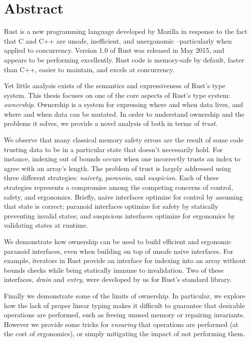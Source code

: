 {}
\begingroup
\let\clearpage\relax
\let\cleardoublepage\relax
\let\cleardoublepage\relax

\chapter*{Abstract}
Rust is a new programming language developed by Mozilla in response to the fact
that C and C++ are unsafe, inefficient, and unergonomic --particularly when
applied to concurrency. Version 1.0 of Rust was released in May 2015, and appears
to be performing excellently. Rust code is memory-safe
by default, faster than C++, easier to maintain, and excels at concurrency.

Yet little analysis exists of the semantics and expressiveness of Rust's type
system. This thesis focuses on one of the core aspects of Rust's type system:
\emph{ownership}. Ownership is a system for expressing where and when data lives, and
where and when data can be mutated. In order to understand ownership and the
problems it solves, we provide a novel analysis of both in terms of \emph{trust}.

We observe that many classical memory safety errors are the result of some
code trusting data to be in a particular state that doesn't necessarily hold.
For instance, indexing out of bounds occurs when one incorrectly trusts an
index to agree with an array's length. The problem of trust is largely addressed using three
different strategies: \emph{naivety}, \emph{paranoia}, and \emph{suspicion}. Each
of these strategies represents a compromise among the competing concerns of control, safety, and
ergonomics. Briefly, naive interfaces optimize for control by assuming that
state is correct; paranoid interfaces optimize for safety by statically preventing
invalid states; and suspicious interfaces optimize for ergonomics by validating
states at runtime.

We demonstrate how ownership can be used to build efficient and ergonomic
paranoid interfaces, even when building on top of unsafe naive interfaces. For example,
iterators in Rust provide an interface for indexing into an array
without bounds checks while being statically immune to invalidation.
Two of these interfaces, \emph{drain} and \emph{entry}, were developed by us for Rust's
standard library.

Finally we demonstrate some of the limits of ownership. In particular, we
explore how the lack of proper linear typing makes it difficult to guarantee
that desirable operations are performed, such as freeing unused memory or
repairing invariants. However we provide some tricks for \emph{ensuring} that operations
are performed (at the cost of ergonomics), or simply mitigating the impact of not
performing them.

\endgroup

\vfill
